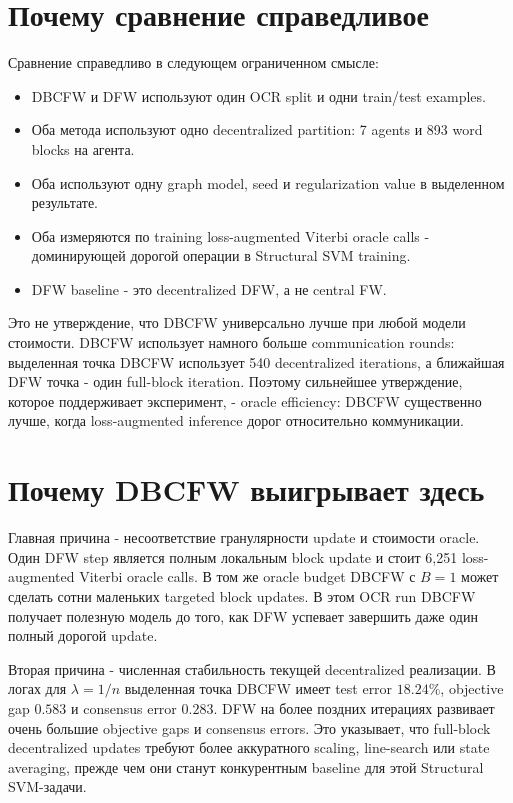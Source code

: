 \documentclass[11pt,a4paper]{article}
\begin{document}
\section{Почему сравнение справедливое}

Сравнение справедливо в следующем ограниченном смысле:
\begin{itemize}
  \item DBCFW и DFW используют один OCR split и одни train/test examples.
  \item Оба метода используют одно decentralized partition: 7 agents и 893 word blocks на агента.
  \item Оба используют одну graph model, seed и regularization value в выделенном результате.
  \item Оба измеряются по training loss-augmented Viterbi oracle calls - доминирующей дорогой операции в Structural SVM training.
  \item DFW baseline - это decentralized DFW, а не central FW.
\end{itemize}

Это не утверждение, что DBCFW универсально лучше при любой модели стоимости. DBCFW использует намного больше communication rounds: выделенная точка DBCFW использует 540 decentralized iterations, а ближайшая DFW точка - один full-block iteration. Поэтому сильнейшее утверждение, которое поддерживает эксперимент, - oracle efficiency: DBCFW существенно лучше, когда loss-augmented inference дорог относительно коммуникации.

\section{Почему DBCFW выигрывает здесь}

Главная причина - несоответствие гранулярности update и стоимости oracle. Один DFW step является полным локальным block update и стоит 6,251 loss-augmented Viterbi oracle calls. В том же oracle budget DBCFW с \(B=1\) может сделать сотни маленьких targeted block updates. В этом OCR run DBCFW получает полезную модель до того, как DFW успевает завершить даже один полный дорогой update.

Вторая причина - численная стабильность текущей decentralized реализации. В логах для \(\lambda=1/n\) выделенная точка DBCFW имеет test error \(18.24\%\), objective gap \(0.583\) и consensus error \(0.283\). DFW на более поздних итерациях развивает очень большие objective gaps и consensus errors. Это указывает, что full-block decentralized updates требуют более аккуратного scaling, line-search или state averaging, прежде чем они станут конкурентным baseline для этой Structural SVM-задачи.
\end{document}
